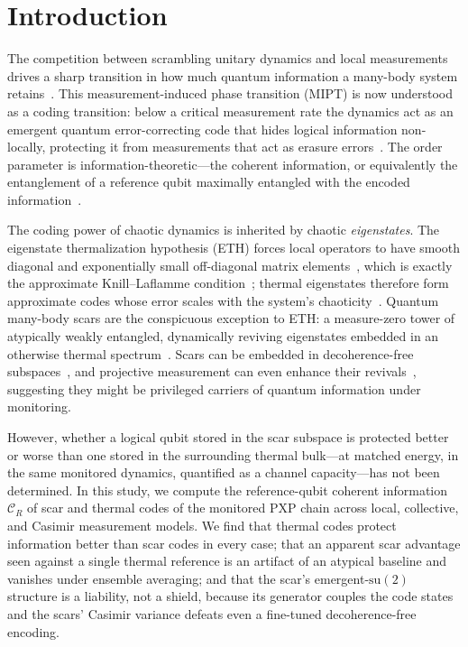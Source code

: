 \documentclass[aps,prxquantum,twocolumn,superscriptaddress,floatfix,longbibliography]{revtex4-2}
\newcommand{\CR}{\mathcal{C}_R}
\begin{document}
\maketitle

\section{Introduction}

The competition between scrambling unitary dynamics and local measurements
drives a sharp transition in how much quantum information a many-body system
retains~\cite{Li2018MIPT,Li2019,Skinner2019,Chan2019,Bao2020,Jian2020,Fisher2023}. This measurement-induced phase
transition (MIPT) is now understood as a coding transition: below a critical
measurement rate the dynamics act as an emergent quantum error-correcting code
that hides logical information non-locally, protecting it from measurements that
act as erasure errors~\cite{Choi2020,Gullans2020,Fan2021}. The order parameter
is information-theoretic---the coherent information, or equivalently the
entanglement of a reference qubit maximally entangled with the encoded
information~\cite{Gullans2020,Gullans2020b,Qian2024}.

The coding power of chaotic dynamics is inherited by chaotic \emph{eigenstates}.
The eigenstate thermalization hypothesis (ETH) forces local operators to have
smooth diagonal and exponentially small off-diagonal matrix
elements~\cite{Deutsch1991,Srednicki1994,Rigol2008,DAlessio2016}, which is
exactly the approximate Knill--Laflamme condition~\cite{KnillLaflamme1997};
thermal eigenstates therefore form approximate codes whose error scales with the
system's chaoticity~\cite{Brandao2019,BaoCheng2019,Qasim2025}. Quantum many-body scars are the
conspicuous exception to ETH: a measure-zero tower of atypically weakly
entangled, dynamically reviving eigenstates embedded in an otherwise thermal
spectrum~\cite{Bernien2017,Turner2018,Turner2018b,Serbyn2021,Moudgalya2022}.
Scars can be embedded in decoherence-free
subspaces~\cite{Zanardi1997,Lidar1998,WangDFS2024}, and projective measurement can
even enhance their revivals~\cite{Paviglianiti2025}, suggesting they might be
privileged carriers of quantum information under monitoring.

However, whether a logical qubit stored in the scar subspace is protected better
or worse than one stored in the surrounding thermal bulk---at matched energy, in
the same monitored dynamics, quantified as a channel capacity---has not been
determined. In this study, we compute the reference-qubit coherent information
$\CR$ of scar and thermal codes of the monitored PXP chain across local,
collective, and Casimir measurement models. We find that thermal codes protect
information better than scar codes in every case; that an apparent scar advantage
seen against a single thermal reference is an artifact of an atypical baseline
and vanishes under ensemble averaging; and that the scar's emergent-$\mathrm{
su}(2)$ structure is a liability, not a shield, because its generator couples the
code states and the scars' Casimir variance defeats even a fine-tuned
decoherence-free encoding.
\end{document}
